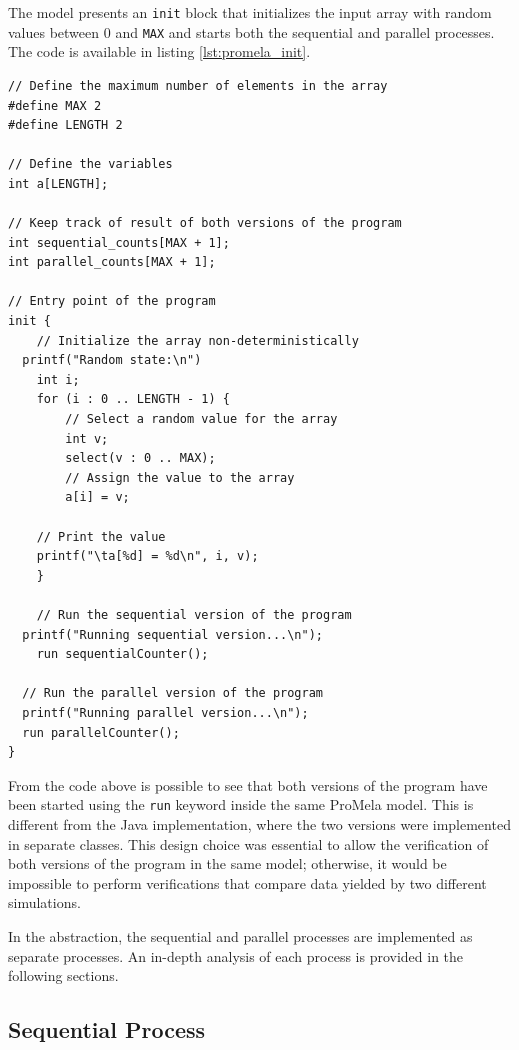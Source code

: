 \documentclass[a4paper, 11pt]{article}
\begin{document}
The model presents an \texttt{init} block that initializes the input array with random values between 0 and \texttt{MAX} and starts both the sequential and parallel processes. The code is available in listing \ref{lst:promela_init}.

\begin{lstlisting}[language=Promela, caption={ProMeLa array initialization and start of sequential and parallel processes}, captionpos=b, breaklines=true, label={lst:promela_init}]
// Define the maximum number of elements in the array
#define MAX 2
#define LENGTH 2

// Define the variables
int a[LENGTH];

// Keep track of result of both versions of the program
int sequential_counts[MAX + 1];
int parallel_counts[MAX + 1];

// Entry point of the program
init {
	// Initialize the array non-deterministically
  printf("Random state:\n")
	int i;
	for (i : 0 .. LENGTH - 1) {
		// Select a random value for the array
		int v;
		select(v : 0 .. MAX);
		// Assign the value to the array
		a[i] = v;

    // Print the value
    printf("\ta[%d] = %d\n", i, v);
	}

	// Run the sequential version of the program
  printf("Running sequential version...\n");
	run sequentialCounter();
 
  // Run the parallel version of the program
  printf("Running parallel version...\n");
  run parallelCounter();
}
\end{lstlisting}

\noindent From the code above is possible to see that both versions of the program have been started using the \texttt{run} keyword inside the same ProMela model. This is different from the Java implementation, where the two versions were implemented in separate classes. This design choice was essential to allow the verification of both versions of the program in the same model; otherwise, it would be impossible to perform verifications that compare data yielded by two different simulations.

In the abstraction, the sequential and parallel processes are implemented as separate processes. An in-depth analysis of each process is provided in the following sections.

\subsection{Sequential Process}
\end{document}
